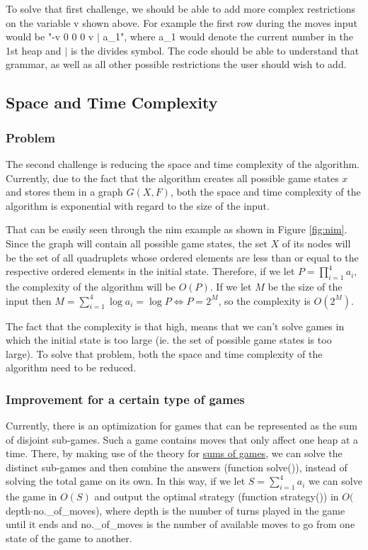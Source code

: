 \documentclass{article}
\begin{document}
To solve that first challenge, we should be able to add more complex restrictions on the variable v shown above. For example the first row during the moves input would be "-v 0 0 0 v $\mid$ a{\_}1", where a{\_}1 would denote the current number in the 1st heap and $\mid$ is the divides symbol. The code should be able to understand that grammar, as well as all other possible restrictions the user should wish to add.

\subsection{Space and Time Complexity}

\subsubsection{Problem}

The second challenge is reducing the space and time complexity of the algorithm. Currently, due to the fact that the algorithm creates all possible game states $x$ and stores them in a graph $G(X, F)$, both the space and time complexity of the algorithm is exponential with regard to the size of the input.

That can be easily seen through the nim example as shown in Figure \ref{fig:nim}. Since the graph will contain all possible game states, the set $X$ of its nodes will be the set of all quadruplets whose ordered elements are less than or equal to the respective ordered elements in the initial state. Therefore, if we let $P = \prod_{i=1}^4 a_i$, the complexity of the algorithm will be $O(P)$. If we let $M$ be the size of the input then $M = \sum_{i=1}^4 \log a_i = \log P \Leftrightarrow P = 2^M$, so the complexity is $O(2^M)$.

The fact that the complexity is that high, means that we can't solve games in which the initial state is too large (ie. the set of possible game states is too large). To solve that problem, both the space and time complexity of the algorithm need to be reduced.

\subsubsection{Improvement for a certain type of games}

Currently, there is an optimization for games that can be represented as the sum of disjoint sub-games. Such a game contains moves that only affect one heap at a time. There, by making use of the theory for \hyperref[subsec:gameSum]{sums of games}, we can solve the distinct sub-games and then combine the answers (function solve()), instead of solving the total game on its own. In this way, if we let $S = \sum_{i=1}^4 a_i$ we can solve the game in $O(S)$ and output the optimal strategy (function strategy()) in $O($depth$ \cdot $no.{\_}of{\_}moves), where depth is the number of turns played in the game until it ends and no.{\_}of{\_}moves is the number of available moves to go from one state of the game to another.
\end{document}
